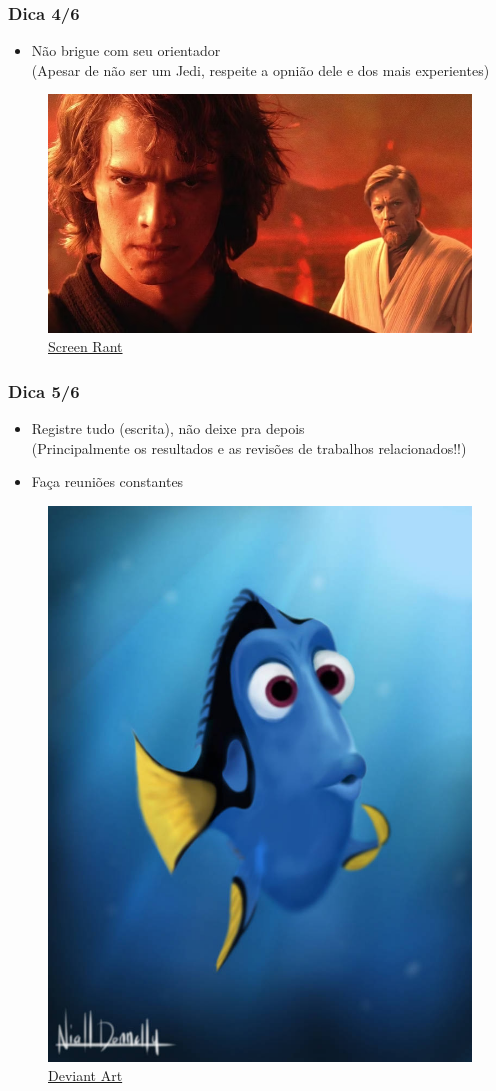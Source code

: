 \begin{frame}
    \frametitle{Dica 4/6}
        \begin{itemize}
            \item Não brigue com seu orientador \\
            {\small (Apesar de não ser um Jedi, respeite a opnião dele e dos mais experientes)}
        \end{itemize}
        \begin{figure}
            \centering
            \includegraphics[width=0.8\linewidth]{figs/Obi-Wan-and-Anakin.png}
            \caption{\href{https://screenrant.com/star-wars-obi-wan-left-anakin-to-die-reason/}{Screen Rant}}
        \end{figure}
\end{frame}

\begin{frame}
    \frametitle{Dica 5/6}
        \begin{itemize}
            \item Registre tudo (escrita), não deixe pra depois \\
            (Principalmente os resultados e as revisões de trabalhos relacionados!!)
            \item Faça reuniões constantes
        \end{itemize}
        \begin{figure}
            \centering
            \includegraphics[width=0.3\linewidth]{figs/dory.jpg}
            \caption{\href{https://www.deviantart.com/the-avenged-evil/art/Finding-Nemo-Dory-325470391}{Deviant Art}}
        \end{figure}
\end{frame}


